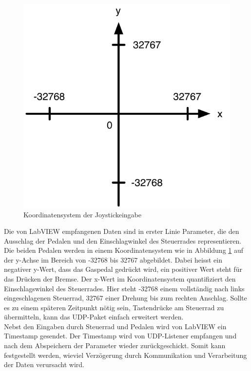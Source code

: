 \newpage

\begin{figure}[H]
\centering 
\includegraphics[width=0.5\linewidth]{src/koordinatensystem.pdf}
\caption{Koordinatensystem der Joystickeingabe} %
\label{Koordinatensystem} %
\end{figure}

Die von LabVIEW empfangenen Daten sind in erster Linie Parameter, die den Ausschlag der Pedalen und den Einschlagwinkel des Steuerrades representieren. Die beiden Pedalen werden in einem Koordinatensystem wie in Abbildung \ref{Koordinatensystem} auf der y-Achse im Bereich von -32768 bis 32767 abgebildet. Dabei heisst ein negativer y-Wert, dass das Gaspedal gedrückt wird, ein positiver Wert steht für das Drücken der Bremse. Der x-Wert im Koordinatensystem quantifiziert den Einschlagswinkel des Steuerrades. Hier steht -32768 einem vollständig nach links eingeschlagenen Steuerrad, 32767 einer Drehung bis zum rechten Anschlag. Sollte es zu einem späteren Zeitpunkt nötig sein, Tastendrücke am Steuerrad zu übermitteln, kann das UDP-Paket einfach erweitert werden.\\
Nebst den Eingaben durch Steuerrad und Pedalen wird von LabVIEW ein Timestamp gesendet. Der Timestamp wird von UDP-Listener empfangen und nach dem Abspeichern der Parameter wieder zurückgeschickt. Somit kann festgestellt werden, wieviel Verzögerung durch Kommunikation und Verarbeitung der Daten verursacht wird.\\

